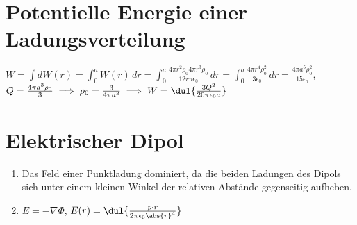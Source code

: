 \documentclass{article}
\begin{document}

\section{Potentielle Energie einer Ladungsverteilung}
$W = \int dW(r) = \int_{0}^{a} W(r) \, dr = \int_{0}^{a} \frac{4\pi r^2 \rho_0 4 \pi r^3 \rho_0}{12r \pi \epsilon_0} \, dr
=  \int_{0}^{a} \frac{4\pi r^4 \rho_0^2}{3\epsilon_0} \, dr = \frac{4\pi a^5 \rho_0^2}{15 \epsilon_0}$, \\
$Q = \frac{4 \pi a^3 \rho_0}{3} \implies \rho_0 = \frac{3}{4 \pi a^3} \implies W = \dul{\frac{3 Q^2}{20 \pi \epsilon_0 a}}$

\section{Elektrischer Dipol}
\begin{enumerate}[label=\alph*)]
    \item Das Feld einer Punktladung dominiert, da die beiden Ladungen des Dipols sich unter einem kleinen Winkel der relativen Abstände gegenseitig aufheben. 
    
    \item $E = - \nabla \Phi$, $E(r) = \dul{\frac{p \cdot r}{2 \pi \epsilon_0 \abs{r}^4}}$
\end{enumerate}
\end{document}
